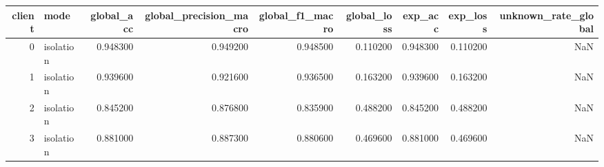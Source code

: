 \begin{tabular}{rlrrrrrrr}
\toprule
client & mode & global_acc & global_precision_macro & global_f1_macro & global_loss & exp_acc & exp_loss & unknown_rate_global \\
\midrule
0 & isolation & 0.948300 & 0.949200 & 0.948500 & 0.110200 & 0.948300 & 0.110200 & NaN \\
1 & isolation & 0.939600 & 0.921600 & 0.936500 & 0.163200 & 0.939600 & 0.163200 & NaN \\
2 & isolation & 0.845200 & 0.876800 & 0.835900 & 0.488200 & 0.845200 & 0.488200 & NaN \\
3 & isolation & 0.881000 & 0.887300 & 0.880600 & 0.469600 & 0.881000 & 0.469600 & NaN \\
\bottomrule
\end{tabular}
